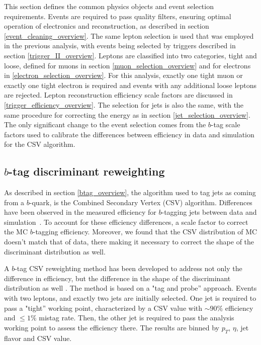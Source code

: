 \par This section defines the common physics objects and event
selection requirements.  Events are required to pass quality filters,
ensuring optimal operation of electronics and reconstruction, as
described in section \ref{event_cleaning_overview}.  The same lepton
selection is used that was employed in the previous analysis, with
events being selected by triggers described in section
\ref{trigger_II_overview}.  Leptons are classified into two
categories, tight and loose, defined for muons in section
\ref{muon_selection_overview} and for electrons in
\ref{electron_selection_overview}.  For this analysis, exactly one
tight muon or exactly one tight electron is required and events with 
any additional loose leptons are rejected.  Lepton reconstruction
efficiency scale factors are discussed
in \ref{trigger_efficiency_overview}.  The selection for jets is
also the same, with the same procedure for correcting the energy as in
section \ref{jet_selection_overview}.  The only significant change to
the event selection comes from the $b$-tag scale factors used to
calibrate the differences between efficiency in data and simulation
for the CSV algorithm.  

\subsection{$b$-tag discriminant reweighting}
\label{b_tag_reweighting_overveiw}

\par As described in section \ref{btag_overview}, the algorithm used
to tag jets as coming from a $b$-quark, is the Combined Secondary
Vertex (CSV) algorithm.  Differences have been observed in the
measured efficiency for $b$-tagging jets between data and
simulation~\cite{CMS-PAS-BTV-11-004}.  To account for these efficiency
differences, a scale factor to correct the MC $b$-tagging
efficiency. Moreover, we found that the CSV distribution 
of MC doesn't match that of data, there making it necessary to correct
the shape of the discriminant distribution as well.  

\par A $b$-tag CSV reweighting method has been developed to address
not only the difference in efficiency, but the difference in the shape
of the discriminant distribution as well \cite{CMS-AN-2013-130}.  
The method is based on a "tag and probe'' approach.   Events with two
leptons, and exactly two jets are initially selected.  One jet is
required to pass a "tight'' working point, characterized by a CSV
value with $\sim90\%$ efficiency and $\le1\%$ mistag rate.  Then, the
other jet is required to pass the analysis working point to assess the
efficiency there.  The results are binned by $p_{T}$, $\eta$, jet
flavor and CSV value.  

